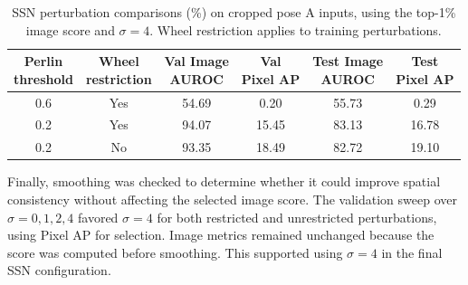 \begin{table}[ht!]
    \centering
    \small
    \setlength{\tabcolsep}{4pt}
    \begin{tabular}{@{}c c c c c c@{}}
        \toprule
        \shortstack{\textbf{Perlin}\\\textbf{threshold}} & \shortstack{\textbf{Wheel}\\\textbf{restriction}} & \shortstack{\textbf{Val Image}\\\textbf{AUROC}} & \shortstack{\textbf{Val}\\\textbf{Pixel AP}} & \shortstack{\textbf{Test Image}\\\textbf{AUROC}} & \shortstack{\textbf{Test}\\\textbf{Pixel AP}} \\
        \midrule
        \midrule
        0.6                                              & Yes                                               & 54.69                                           & 0.20                                         & 55.73                                            & 0.29                                          \\
        0.2                                              & Yes                                               & 94.07                                           & 15.45                                        & 83.13                                            & 16.78                                         \\
        0.2                                              & No                                                & 93.35                                           & 18.49                                        & 82.72                                            & 19.10                                         \\
        \bottomrule
    \end{tabular}
    \vspace{5mm}
    \caption{SSN perturbation comparisons (\%) on cropped pose A inputs, using the top-1\% image score and \(\sigma=4\). Wheel restriction applies to training perturbations.}
    \label{tab:damage-ssn-perturbation-ablation}
\end{table}

Finally, smoothing was checked to determine whether it could improve spatial consistency without affecting the selected image score. The validation sweep over \(\sigma=0,1,2,4\) favored \(\sigma=4\) for both restricted and unrestricted perturbations, using Pixel AP for selection. Image metrics remained unchanged because the score was computed before smoothing. This supported using \(\sigma=4\) in the final SSN configuration.

